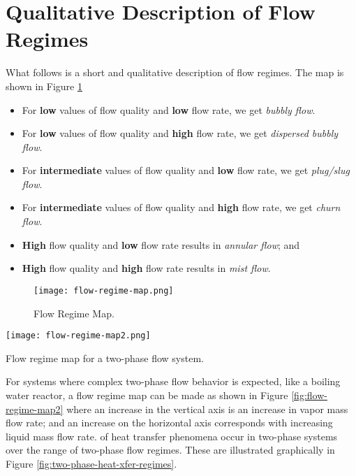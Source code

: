 \section{Qualitative Description of Flow Regimes}
What follows is a short and qualitative description of flow regimes. The map is shown in Figure \ref{fig:flow-regime-map} 
\begin{itemize}
\item For \textbf{low} values of flow quality and \textbf{low} flow rate, we get \emph{bubbly flow}.

\item For \textbf{low} values of flow quality and \textbf{high} flow rate, we get \emph{dispersed bubbly flow}.

\item For \textbf{intermediate} values of flow quality and \textbf{low} flow rate, we get \emph{plug/slug flow}.
\item For \textbf{intermediate} values of flow quality and \textbf{high} flow rate, we get \emph{churn flow}.

\item \textbf{High} flow quality and \textbf{low} flow rate results in \emph{annular flow}; and
\item \textbf{High} flow quality and \textbf{high} flow rate results in \emph{mist flow}.


\end{itemize}

\begin{figure}
\texttt{[image: flow-regime-map.png]}
\caption{Flow Regime Map.}
\label{fig:flow-regime-map}
\end{figure}

\begin{marginfigure}
\texttt{[image: flow-regime-map2.png]}
\caption{Flow regime map for a two-phase flow system.}
\label{fig:flow-regime-map2}
\end{marginfigure}


For systems where complex two-phase flow behavior is expected, like a boiling water reactor, a flow regime map can be made as shown in Figure \ref{fig:flow-regime-map2} where an increase in the vertical axis is an increase in vapor mass flow rate; and an increase on the horizontal axis corresponds with increasing liquid mass flow rate.
 of heat transfer phenomena occur in two-phase systems over the range of two-phase flow regimes.  These are illustrated graphically in Figure \ref{fig:two-phase-heat-xfer-regimes}.  

